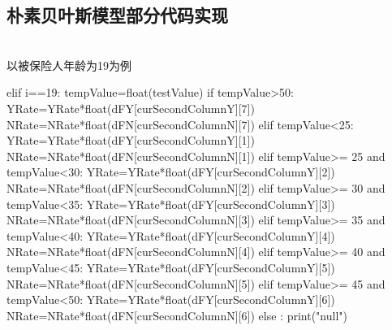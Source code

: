 \documentclass[UTF8,12pt,songti]{ctexart}
\begin{document}
\subsection{朴素贝叶斯模型部分代码实现} \quad \\
以被保险人年龄为19为例
\begin{python}
 elif i==19:
            tempValue=float(testValue)
            if tempValue>50:
                YRate=YRate*float(dFY[curSecondColumnY][7])
                NRate=NRate*float(dFN[curSecondColumnN][7])
            elif tempValue<25:
                YRate=YRate*float(dFY[curSecondColumnY][1])
                NRate=NRate*float(dFN[curSecondColumnN][1])
            elif tempValue>= 25 and tempValue<30:
                YRate=YRate*float(dFY[curSecondColumnY][2])
                NRate=NRate*float(dFN[curSecondColumnN][2])
            elif tempValue>= 30 and tempValue<35:
                YRate=YRate*float(dFY[curSecondColumnY][3])
                NRate=NRate*float(dFN[curSecondColumnN][3])
            elif tempValue>= 35 and tempValue<40:
                YRate=YRate*float(dFY[curSecondColumnY][4])
                NRate=NRate*float(dFN[curSecondColumnN][4])
            elif tempValue>= 40 and tempValue<45:
                YRate=YRate*float(dFY[curSecondColumnY][5])
                NRate=NRate*float(dFN[curSecondColumnN][5])
            elif tempValue>= 45 and tempValue<50:
                YRate=YRate*float(dFY[curSecondColumnY][6])
                NRate=NRate*float(dFN[curSecondColumnN][6])
            else :
                print("null")

\end{python}
\end{document}
